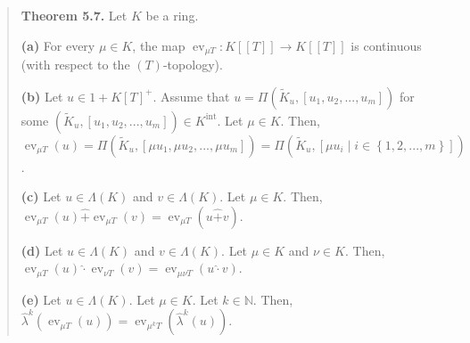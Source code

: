 \documentclass[numbers=enddot,12pt,final,onecolumn,notitlepage]{scrartcl}%
\begin{document}
\begin{quote}
\textbf{Theorem 5.7.} Let $K$ be a ring.

\textbf{(a)} For every $\mu\in K$, the map $\operatorname*{ev}_{\mu
T}:K\left[  \left[  T\right]  \right]  \rightarrow K\left[  \left[  T\right]
\right]  $ is continuous (with respect to the $\left(  T\right)  $-topology).

\textbf{(b)} Let $u\in1+K\left[  T\right]  ^{+}$. Assume that $u=\Pi\left(
\widetilde{K}_{u},\left[  u_{1},u_{2},...,u_{m}\right]  \right)  $ for some
$\left(  \widetilde{K}_{u},\left[  u_{1},u_{2},...,u_{m}\right]  \right)  \in
K^{\operatorname*{int}}$. Let $\mu\in K$. Then, $\operatorname*{ev}_{\mu
T}\left(  u\right)  =\Pi\left(  \widetilde{K}_{u},\left[  \mu u_{1},\mu
u_{2},...,\mu u_{m}\right]  \right)  =\Pi\left(  \widetilde{K}_{u},\left[  \mu
u_{i}\mid i\in\left\{  1,2,...,m\right\}  \right]  \right)  $.

\textbf{(c)} Let $u\in\Lambda\left(  K\right)  $ and $v\in\Lambda\left(
K\right)  $. Let $\mu\in K$. Then, $\operatorname*{ev}_{\mu T}\left(
u\right)  \widehat{+}\operatorname*{ev}_{\mu T}\left(  v\right)
=\operatorname*{ev}_{\mu T}\left(  u\widehat{+}v\right)  $.

\textbf{(d)} Let $u\in\Lambda\left(  K\right)  $ and $v\in\Lambda\left(
K\right)  $. Let $\mu\in K$ and $\nu\in K$. Then, $\operatorname*{ev}_{\mu
T}\left(  u\right)  \widehat{\cdot}\operatorname*{ev}_{\nu T}\left(  v\right)
=\operatorname*{ev}_{\mu\nu T}\left(  u\widehat{\cdot}v\right)  $.

\textbf{(e)} Let $u\in\Lambda\left(  K\right)  $. Let $\mu\in K$. Let
$k\in\mathbb{N}$. Then, $\widehat{\lambda}^{k}\left(  \operatorname*{ev}_{\mu
T}\left(  u\right)  \right)  =\operatorname*{ev}_{\mu^{k}T}\left(
\widehat{\lambda}^{k}\left(  u\right)  \right)  $.
\end{quote}
\end{document}
